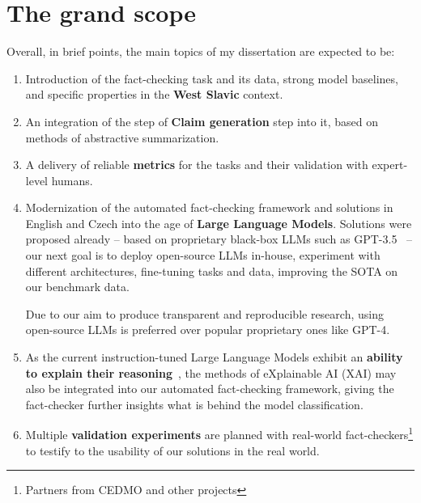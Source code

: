 \section{The grand scope}
Overall, in brief points, the main topics of my dissertation are expected to be:
\begin{enumerate}
    \item Introduction of the fact-checking task and its data, strong model baselines, and specific properties in the \textbf{West Slavic} context.
    \item An integration of the step of \textbf{Claim generation} step into it, based on methods of abstractive summarization.
    \item A delivery of reliable \textbf{metrics} for the tasks and their validation with expert-level humans.
    \item Modernization of the automated fact-checking framework and solutions in English and Czech into the age of \textbf{Large Language Models}.
    Solutions were proposed already -- based on proprietary black-box LLMs such as GPT-3.5~\cite{bing} -- our next goal is to deploy open-source LLMs in-house, experiment with different architectures, fine-tuning tasks and data, improving the SOTA on our benchmark data.

    Due to our aim to produce transparent and reproducible research, using open-source LLMs is preferred over popular proprietary ones like GPT-4.
    \item As the current instruction-tuned Large Language Models exhibit an \textbf{ability to explain their reasoning}~\cite{SAEED2023110273}, the methods of eXplainable AI (XAI) may also be integrated into our automated fact-checking framework, giving the fact-checker further insights what is behind the model classification.
    \item Multiple \textbf{validation experiments} are planned with real-world fact-checkers\footnote{Partners from CEDMO and other projects} to testify to the usability of our solutions in the real world.
\end{enumerate}